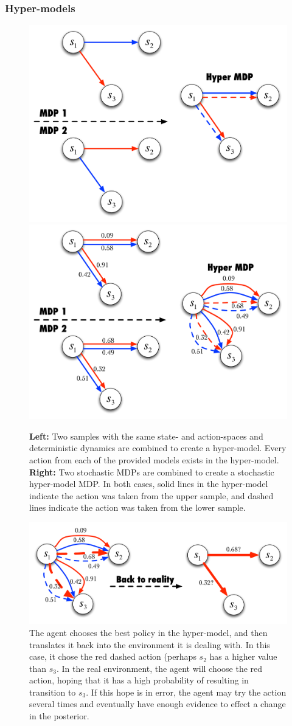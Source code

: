 \subsubsection{Hyper-models}

\label{boss:alg:gen:hyper}

\begin{figure}[t]
\begin{center}
\includegraphics[width=0.45\linewidth]{hyper-construction}
\includegraphics[width=0.45\linewidth]{hyper-stoch-construction}
\caption{\textbf{Left:} Two samples with the same state- and action-spaces and deterministic dynamics are combined to create a hyper-model. Every action from each of the provided models exists in the hyper-model. \textbf{Right:} Two stochastic MDPs are combined to create a stochastic hyper-model MDP. In both cases, solid lines in the hyper-model indicate the action was taken from the upper sample, and dashed lines indicate the action was taken from the lower sample.}
\label{sec:boss:hyper-model-creation}
\end{center}
\end{figure}


\begin{figure}[t]
\begin{center}
\includegraphics[width=0.75\linewidth]{hyper-to-real}
\caption{The agent chooses the best policy in the hyper-model, and then translates it back into the environment it is dealing with. In this case, it chose the red dashed action (perhaps $s_2$ has a higher value than $s_3$. In the real environment, the agent will choose the red action, hoping that it has a high probability of resulting in transition to $s_3$. If this hope is in error, the agent may try the action several times and eventually have enough evidence to effect a change in the posterior.}
\label{sec:boss:hyper-to-real}
\end{center}
\end{figure}

